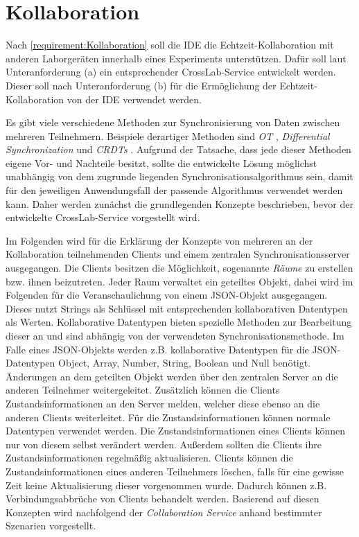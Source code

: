 \section{Kollaboration}\label{section:konzeption:kollaboration}

\usetikzlibrary{arrows.meta}

Nach \autoref{requirement:Kollaboration} soll die IDE die Echtzeit-Kollaboration mit anderen Laborgeräten innerhalb eines Experiments unterstützen. Dafür soll laut Unteranforderung (a) ein entsprechender CrossLab-Service entwickelt werden. Dieser soll nach Unteranforderung (b) für die Ermöglichung der Echtzeit-Kollaboration von der IDE verwendet werden.

Es gibt viele verschiedene Methoden zur Synchronisierung von Daten zwischen mehreren Teilnehmern. Beispiele derartiger Methoden sind \emph{\ac{OT}} \cite{sun_operational_1998}, \emph{Differential Synchronization} \cite{fraser_differential_2009} und \emph{\acp{CRDT}} \cite{shapiro_conflict-free_2011}. Aufgrund der Tatsache, dass jede dieser Methoden eigene Vor- und Nachteile besitzt, sollte die entwickelte Lösung möglichst unabhängig von dem zugrunde liegenden Synchronisationsalgorithmus sein, damit für den jeweiligen Anwendungsfall der passende Algorithmus verwendet werden kann. Daher werden zunächst die grundlegenden Konzepte beschrieben, bevor der entwickelte CrossLab-Service vorgestellt wird.

Im Folgenden wird für die Erklärung der Konzepte von mehreren an der Kollaboration teilnehmenden Clients und einem zentralen Synchronisationsserver ausgegangen. Die Clients besitzen die Möglichkeit, sogenannte \textit{Räume} zu erstellen bzw. ihnen beizutreten. Jeder Raum verwaltet ein geteiltes Objekt, dabei wird im Folgenden für die Veranschaulichung von einem JSON-Objekt ausgegangen. Dieses nutzt Strings als Schlüssel mit entsprechenden kollaborativen Datentypen als Werten. Kollaborative Datentypen bieten spezielle Methoden zur Bearbeitung dieser an und sind abhängig von der verwendeten Synchronisationsmethode. Im Falle eines JSON-Objekts werden z.B. kollaborative Datentypen für die JSON-Datentypen Object, Array, Number, String, Boolean und Null benötigt. Änderungen an dem geteilten Objekt werden über den zentralen Server an die anderen Teilnehmer weitergeleitet. Zusätzlich können die Clients Zustandsinformationen an den Server melden, welcher diese ebenso an die anderen Clients weiterleitet. Für die Zustandsinformationen können normale Datentypen verwendet werden. Die Zustandsinformationen eines Clients können nur von diesem selbst verändert werden. Außerdem sollten die Clients ihre Zustandsinformationen regelmäßig aktualisieren. Clients können die Zustandsinformationen eines anderen Teilnehmers löschen, falls für eine gewisse Zeit keine Aktualisierung dieser vorgenommen wurde. Dadurch können z.B. Verbindungsabbrüche von Clients behandelt werden. Basierend auf diesen Konzepten wird nachfolgend der \textit{Collaboration Service} anhand bestimmter Szenarien vorgestellt.

